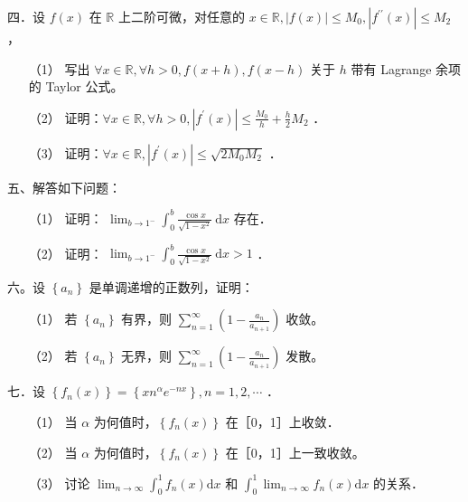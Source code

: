 \documentclass{article}
\begin{document}
四．设 \(f(x)\) 在 \(\mathbb{R}\) 上二阶可微，对任意的 \(x \in \mathbb{R},|f(x)| \leq M_{0},\left|f^{\prime \prime}(x)\right| \leq M_{2}\) ，

\begin{itemize}
  \item[（1）] 写出 \(\forall x \in \mathbb{R}, \forall h>0, f(x+h), f(x-h)\) 关于 \(h\) 带有 Lagrange 余项的 Taylor 公式。
  \item[（2）] 证明：\(\forall x \in \mathbb{R}, \forall h>0,|f^{\prime}(x)| \leq \frac{M_{0}}{h}+\frac{h}{2} M_{2}\) ．
  \item[（3）] 证明：\(\forall x \in \mathbb{R},|f^{\prime}(x)| \leq \sqrt{2 M_{0} M_{2}}\) ．
\end{itemize}

五、解答如下问题：

\begin{itemize}
  \item[（1）] 证明： \(\lim _{b \rightarrow 1^{-}} \int_{0}^{b} \frac{\cos x}{\sqrt{1-x^{2}}} \mathrm{~d} x\) 存在．
  \item[（2）] 证明： \(\lim _{b \rightarrow 1^{-}} \int_{0}^{b} \frac{\cos x}{\sqrt{1-x^{2}}} \mathrm{~d} x>1\) ．
\end{itemize}

六。设 \(\left\{a_{n}\right\}\) 是单调递增的正数列，证明：

\begin{itemize}
  \item[（1）] 若 \(\left\{a_{n}\right\}\) 有界，则 \(\sum_{n=1}^{\infty}\left(1-\frac{a_{n}}{a_{n+1}}\right)\) 收敛。
  \item[（2）] 若 \(\left\{a_{n}\right\}\) 无界，则 \(\sum_{n=1}^{\infty}\left(1-\frac{a_{n}}{a_{n+1}}\right)\) 发散。
\end{itemize}

七．设 \(\left\{f_{n}(x)\right\}=\left\{x n^{\alpha} e^{-n x}\right\}, n=1,2, \cdots\) ．

\begin{itemize}
  \item[（1）] 当 \(\alpha\) 为何值时，\(\left\{f_{n}(x)\right\}\) 在［0，1］上收敛．
  \item[（2）] 当 \(\alpha\) 为何值时，\(\left\{f_{n}(x)\right\}\) 在［0，1］上一致收敛。
  \item[（3）] 讨论 \(\lim _{n \rightarrow \infty} \int_{0}^{1} f_{n}(x) \mathrm{d} x\) 和 \(\int_{0}^{1} \lim _{n \rightarrow \infty} f_{n}(x) \mathrm{d} x\) 的关系．
\end{itemize}
\end{document}
